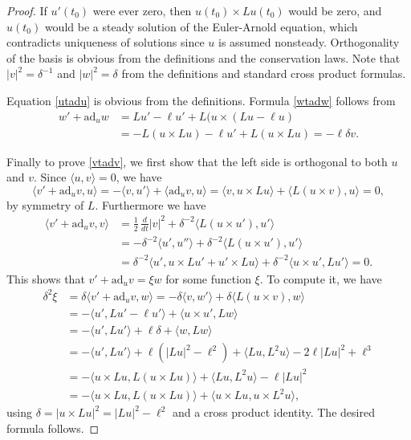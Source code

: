 \documentclass[oneside, 11pt]{amsart}
\numberwithin{equation}{section}
\newcommand{\ad}{\mathrm{ad}}
\begin{document}
\begin{proof}
If $u'(t_0)$ were ever zero, then $u(t_0)\times Lu(t_0)$ would be zero, and $u(t_0)$ would be a steady solution of the Euler-Arnold equation, which contradicts uniqueness of solutions since $u$ is assumed nonsteady. Orthogonality of the basis is obvious from the definitions and the conservation laws. Note that $\lvert v\rvert^2 = \delta^{-1}$ and $\lvert w\vert^2 = \delta$ from the definitions and standard cross product formulas.

Equation \eqref{utadu} is obvious from the definitions. Formula \eqref{wtadw} follows from 
\begin{align*} 
w' + \ad_uw &= Lu' - \ell u' + L(u\times (Lu-\ell u) \\
&= -L(u\times Lu) -\ell u' + L(u\times Lu) = -\ell \delta v.
\end{align*}

Finally to prove \eqref{vtadv}, we first show that the left side is orthogonal to both $u$ and $v$. Since $\langle u,v\rangle = 0$, we have 
$$ 
\langle v'+\ad_uv, u\rangle = -\langle v, u'\rangle + \langle \ad_uv, u\rangle = \langle v, u\times Lu\rangle + \langle L(u\times v), u\rangle = 0,$$
by symmetry of $L$. Furthermore we have 
\begin{align*}
\langle v'+\ad_uv, v\rangle &= \frac{1}{2} \, \frac{d}{dt} \lvert v\rvert^2 + \delta^{-2} \langle L(u\times u'), u'\rangle \\
&= -\delta^{-2} \langle u', u''\rangle + \delta^{-2} \langle L(u\times u'), u'\rangle \\
&= \delta^{-2} \langle u', u\times Lu' + u'\times Lu\rangle + \delta^{-2} \langle u\times u', Lu'\rangle = 0.
\end{align*}
This shows that $v'+\ad_uv = \xi w$ for some function $\xi$. To compute it, we have 
\begin{align*}
\delta^2 \xi &= \delta\langle v'+\ad_uv, w\rangle = -\delta\langle v, w'\rangle + \delta\langle L(u\times v), w\rangle \\
&= -\langle u', Lu' - \ell u'\rangle + \langle u\times u', Lw\rangle \\
&= -\langle u',Lu'\rangle + \ell \delta + \langle w, Lw\rangle \\ 
&= -\langle u',Lu'\rangle + \ell(\lvert Lu\rvert^2 - \ell^2) + \langle Lu, L^2u\rangle - 2\ell \lvert Lu\rvert^2 + \ell^3 \\
&= -\langle u\times Lu, L(u\times Lu)\rangle + 
\langle Lu, L^2u\rangle - \ell \lvert Lu\rvert^2 \\
&= -\langle u\times Lu, L(u\times Lu)\rangle + 
\langle u\times Lu, u\times L^2u\rangle, 
\end{align*}
using $\delta = \lvert u\times Lu\rvert^2 = \lvert Lu\rvert^2 - \ell^2$ and a cross product identity. The desired formula follows.
\end{proof}
\end{document}
